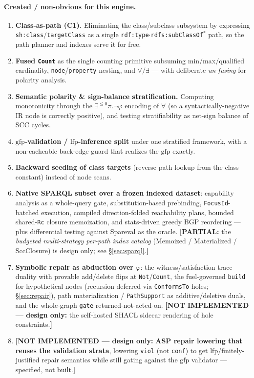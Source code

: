 \documentclass[11pt]{article}
\newcommand{\lfp}{\mathrm{lfp}}
\newcommand{\gfp}{\mathrm{gfp}}
\newcommand{\Star}{{*}}
\newcommand{\code}[1]{\texttt{#1}}
\theoremstyle{definition}
\newcommand{\NI}[1]{{\color{nired}\textbf{[NOT IMPLEMENTED --- design only:} #1\textbf{]}}}
\newcommand{\PART}[1]{{\color{nired}\textbf{[PARTIAL:} #1\textbf{]}}}
\begin{document}
\paragraph{Created / non-obvious for this engine.}
\begin{enumerate}[leftmargin=1.6em]
  \item \textbf{Class-as-path (C1).} Eliminating the class/subclass subsystem by
  expressing \code{sh:class}/\code{targetClass} as a single
  \code{rdf:type}$\cdot$\code{rdfs:subClassOf}$^{\Star}$ path, so the path planner
  and indexes serve it for free.
  \item \textbf{Fused \code{Count}} as the single counting primitive subsuming
  min/max/qualified cardinality, \code{node}/\code{property} nesting, and
  $\forall/\exists$ --- with deliberate \emph{un-fusing} for polarity analysis.
  \item \textbf{Semantic polarity \& sign-balance stratification.} Computing
  monotonicity through the $\exists^{\leq0}\pi.\neg\varphi$ encoding of $\forall$
  (so a syntactically-negative IR node is correctly positive), and testing
  stratifiability as net-sign balance of SCC cycles.
  \item \textbf{$\gfp$-validation / $\lfp$-inference split} under one stratified
  framework, with a non-cacheable back-edge guard that realizes the $\gfp$ exactly.
  \item \textbf{Backward seeding of class targets} (reverse path lookup from the
  class constant) instead of node scans.
  \item \textbf{Native SPARQL subset over a frozen indexed dataset}: capability
  analysis as a whole-query gate, substitution-based prebinding,
  \code{FocusId}-batched execution, compiled direction-folded reachability plans,
  bounded shared-\code{Rc} closure memoization, and stats-driven greedy BGP
  reordering --- plus differential testing against Spareval as the oracle.
  \PART{the \emph{budgeted multi-strategy per-path index catalog} (Memoized /
  Materialized / SccClosure) is design only; see \S\ref{sec:sparql}.}
  \item \textbf{Symbolic repair as abduction over $\varphi$}: the
  witness/satisfaction-trace duality with provable add/delete flips at
  \code{Not}/\code{Count}, the fuel-governed \code{build} for hypothetical nodes
  (recursion deferred via \code{ConformsTo} holes; \S\ref{sec:repair}),
  path materialization / \code{PathSupport} as additive/deletive duals, and the
  whole-graph \code{gate} returned-not-acted-on. \NI{the self-hosted SHACL sidecar
  rendering of hole constraints.}
  \item \NI{\textbf{ASP repair lowering that reuses the validation strata},
  lowering \code{viol} (not \code{conf}) to get $\lfp$/finitely-justified repair
  semantics while still gating against the $\gfp$ validator --- specified, not
  built.}
\end{enumerate}
\end{document}
